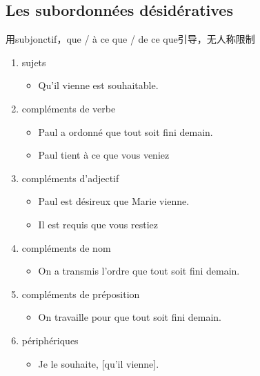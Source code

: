 \documentclass[UTF8]{report}
\begin{document}
\subsection{Les subordonnées désidératives}
用subjonctif，que / à ce que / de ce que引导，无人称限制
\begin{enumerate}
    \item sujets
    \begin{itemize}
        \item Qu’il vienne est souhaitable.
    \end{itemize}
    \item compléments de verbe
    \begin{itemize}
        \item Paul a ordonné que tout soit fini demain.
        \item Paul tient à ce que vous veniez
    \end{itemize}
    \item compléments d’adjectif
    \begin{itemize}
        \item Paul est désireux que Marie vienne.
        \item Il est requis que vous restiez
    \end{itemize}
    \item compléments de nom
    \begin{itemize}
        \item On a transmis l’ordre que tout soit fini demain.
    \end{itemize}
    \item compléments de préposition
    \begin{itemize}
        \item On travaille pour que tout soit fini demain.
    \end{itemize}
    \item périphériques
    \begin{itemize}
        \item Je le souhaite, [qu’il vienne].
    \end{itemize}
\end{enumerate}
\end{document}
